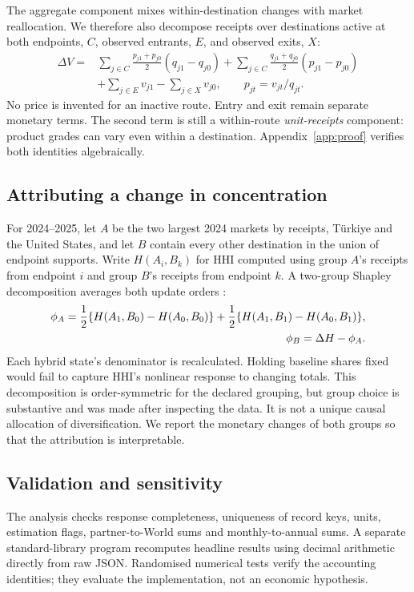 \documentclass[11pt,a4paper]{article}
\begin{document}
The aggregate component mixes within-destination changes with market reallocation. We therefore also decompose receipts over destinations active at both endpoints, $C$, observed entrants, $E$, and observed exits, $X$:
\begin{align}\label{eq:routes}
 \Delta V={}&\sum_{j\in C}\frac{p_{j1}+p_{j0}}{2}(q_{j1}-q_{j0})
 +\sum_{j\in C}\frac{q_{j1}+q_{j0}}{2}(p_{j1}-p_{j0})\nonumber\\
 &+\sum_{j\in E}v_{j1}-\sum_{j\in X}v_{j0},\qquad p_{jt}=v_{jt}/q_{jt}.
\end{align}
No price is invented for an inactive route. Entry and exit remain separate monetary terms. The second term is still a within-route \emph{unit-receipts} component: product grades can vary even within a destination. Appendix~\ref{app:proof} verifies both identities algebraically.

\subsection{Attributing a change in concentration}
For 2024--2025, let $A$ be the two largest 2024 markets by receipts, T\"urkiye and the United States, and let $B$ contain every other destination in the union of endpoint supports. Write $H(A_i,B_k)$ for HHI computed using group $A$'s receipts from endpoint $i$ and group $B$'s receipts from endpoint $k$. A two-group Shapley decomposition averages both update orders \citep{shapley1953}:
\begin{align}
 \phi_A={1\over2}\{H(A_1,B_0)-H(A_0,B_0)\}
 +{1\over2}\{H(A_1,B_1)-H(A_0,B_1)\},\\
 \phi_B=\Delta H-\phi_A.
\end{align}
Each hybrid state's denominator is recalculated. Holding baseline shares fixed would fail to capture HHI's nonlinear response to changing totals. This decomposition is order-symmetric for the declared grouping, but group choice is substantive and was made after inspecting the data. It is not a unique causal allocation of diversification. We report the monetary changes of both groups so that the attribution is interpretable.

\subsection{Validation and sensitivity}
The analysis checks response completeness, uniqueness of record keys, units, estimation flags, partner-to-World sums and monthly-to-annual sums. A separate standard-library program recomputes headline results using decimal arithmetic directly from raw JSON. Randomised numerical tests verify the accounting identities; they evaluate the implementation, not an economic hypothesis.
\end{document}
